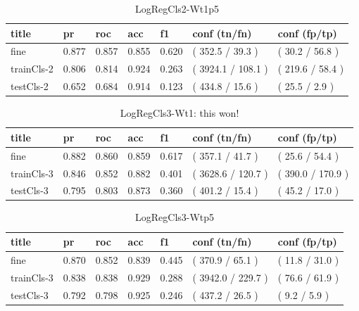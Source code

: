 \documentclass[ms]{nuthesis}
\begin{document}
\FloatBarrier
\begin{table}[H]
\centering
\begin{tabular}{|l||l||l||l||l||l||l|}\toprule
title & pr & roc & acc & f1 & conf (tn/fn) & conf (fp/tp) \\ \midrule
fine & 0.877 & 0.857 & 0.855 & 0.620 & ( 352.5 / 39.3 ) & ( 30.2 / 56.8 ) \\
trainCls-2 & 0.806 & 0.814 & 0.924 & 0.263 & ( 3924.1 / 108.1 ) & ( 219.6 / 58.4 ) \\
testCls-2 & 0.652 & 0.684 & 0.914 & 0.123 & ( 434.8 / 15.6 ) & ( 25.5 / 2.9 ) \\ \bottomrule
\end{tabular}
\caption{LogRegCls2-Wt1p5}
\label{tab:LogRegCls2-Wt1p5}
\end{table}
\FloatBarrier

\FloatBarrier
\begin{table}[H]
\centering
\begin{tabular}{|l||l||l||l||l||l||l|}\toprule
title & pr & roc & acc & f1 & conf (tn/fn) & conf (fp/tp) \\ \midrule
fine & 0.882 & 0.860 & 0.859 & 0.617 & ( 357.1 / 41.7 ) & ( 25.6 / 54.4 ) \\
trainCls-3 & 0.846 & 0.852 & 0.882 & 0.401 & ( 3628.6 / 120.7 ) & ( 390.0 / 170.9 ) \\
testCls-3 & 0.795 & 0.803 & 0.873 & 0.360 & ( 401.2 / 15.4 ) & ( 45.2 / 17.0 ) \\ \bottomrule
\end{tabular}
\caption{LogRegCls3-Wt1: this won!}
\label{tab:LogRegCls3-Wt1}
\end{table}
\FloatBarrier


\FloatBarrier
\begin{table}[H]
\centering
\begin{tabular}{|l||l||l||l||l||l||l|}\toprule
title & pr & roc & acc & f1 & conf (tn/fn) & conf (fp/tp) \\ \midrule
fine & 0.870 & 0.852 & 0.839 & 0.445 & ( 370.9 / 65.1 ) & ( 11.8 / 31.0 ) \\
trainCls-3 & 0.838 & 0.838 & 0.929 & 0.288 & ( 3942.0 / 229.7 ) & ( 76.6 / 61.9 ) \\
testCls-3 & 0.792 & 0.798 & 0.925 & 0.246 & ( 437.2 / 26.5 ) & ( 9.2 / 5.9 ) \\ \bottomrule
\end{tabular}
\caption{LogRegCls3-Wtp5}
\label{tab:LogRegCls3-Wtp5}
\end{table}
\FloatBarrier
\end{document}
